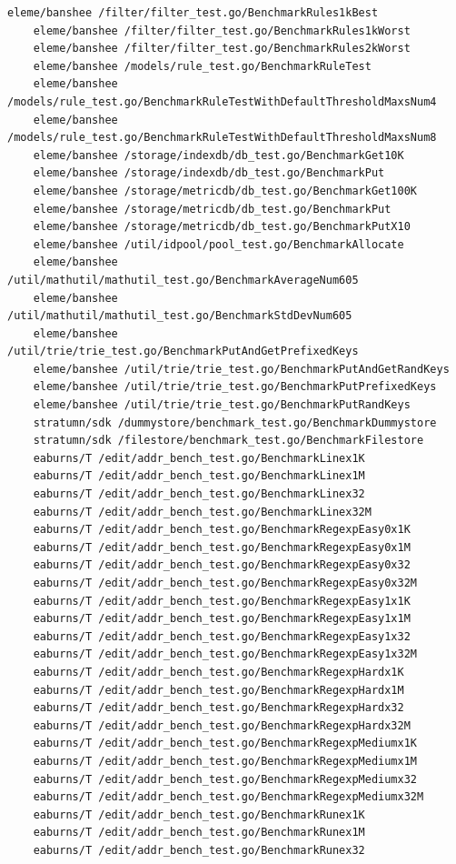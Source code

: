 \documentclass{seal_thesis}
\begin{document}
\begin{lstlisting}[basicstyle=\tiny]
	eleme/banshee /filter/filter_test.go/BenchmarkRules1kBest
	eleme/banshee /filter/filter_test.go/BenchmarkRules1kWorst
	eleme/banshee /filter/filter_test.go/BenchmarkRules2kWorst
	eleme/banshee /models/rule_test.go/BenchmarkRuleTest
	eleme/banshee /models/rule_test.go/BenchmarkRuleTestWithDefaultThresholdMaxsNum4
	eleme/banshee /models/rule_test.go/BenchmarkRuleTestWithDefaultThresholdMaxsNum8
	eleme/banshee /storage/indexdb/db_test.go/BenchmarkGet10K
	eleme/banshee /storage/indexdb/db_test.go/BenchmarkPut
	eleme/banshee /storage/metricdb/db_test.go/BenchmarkGet100K
	eleme/banshee /storage/metricdb/db_test.go/BenchmarkPut
	eleme/banshee /storage/metricdb/db_test.go/BenchmarkPutX10
	eleme/banshee /util/idpool/pool_test.go/BenchmarkAllocate
	eleme/banshee /util/mathutil/mathutil_test.go/BenchmarkAverageNum605
	eleme/banshee /util/mathutil/mathutil_test.go/BenchmarkStdDevNum605
	eleme/banshee /util/trie/trie_test.go/BenchmarkPutAndGetPrefixedKeys
	eleme/banshee /util/trie/trie_test.go/BenchmarkPutAndGetRandKeys
	eleme/banshee /util/trie/trie_test.go/BenchmarkPutPrefixedKeys
	eleme/banshee /util/trie/trie_test.go/BenchmarkPutRandKeys
	stratumn/sdk /dummystore/benchmark_test.go/BenchmarkDummystore
	stratumn/sdk /filestore/benchmark_test.go/BenchmarkFilestore
	eaburns/T /edit/addr_bench_test.go/BenchmarkLinex1K
	eaburns/T /edit/addr_bench_test.go/BenchmarkLinex1M
	eaburns/T /edit/addr_bench_test.go/BenchmarkLinex32
	eaburns/T /edit/addr_bench_test.go/BenchmarkLinex32M
	eaburns/T /edit/addr_bench_test.go/BenchmarkRegexpEasy0x1K
	eaburns/T /edit/addr_bench_test.go/BenchmarkRegexpEasy0x1M
	eaburns/T /edit/addr_bench_test.go/BenchmarkRegexpEasy0x32
	eaburns/T /edit/addr_bench_test.go/BenchmarkRegexpEasy0x32M
	eaburns/T /edit/addr_bench_test.go/BenchmarkRegexpEasy1x1K
	eaburns/T /edit/addr_bench_test.go/BenchmarkRegexpEasy1x1M
	eaburns/T /edit/addr_bench_test.go/BenchmarkRegexpEasy1x32
	eaburns/T /edit/addr_bench_test.go/BenchmarkRegexpEasy1x32M
	eaburns/T /edit/addr_bench_test.go/BenchmarkRegexpHardx1K
	eaburns/T /edit/addr_bench_test.go/BenchmarkRegexpHardx1M
	eaburns/T /edit/addr_bench_test.go/BenchmarkRegexpHardx32
	eaburns/T /edit/addr_bench_test.go/BenchmarkRegexpHardx32M
	eaburns/T /edit/addr_bench_test.go/BenchmarkRegexpMediumx1K
	eaburns/T /edit/addr_bench_test.go/BenchmarkRegexpMediumx1M
	eaburns/T /edit/addr_bench_test.go/BenchmarkRegexpMediumx32
	eaburns/T /edit/addr_bench_test.go/BenchmarkRegexpMediumx32M
	eaburns/T /edit/addr_bench_test.go/BenchmarkRunex1K
	eaburns/T /edit/addr_bench_test.go/BenchmarkRunex1M
	eaburns/T /edit/addr_bench_test.go/BenchmarkRunex32

\end{lstlisting}
\end{document}
